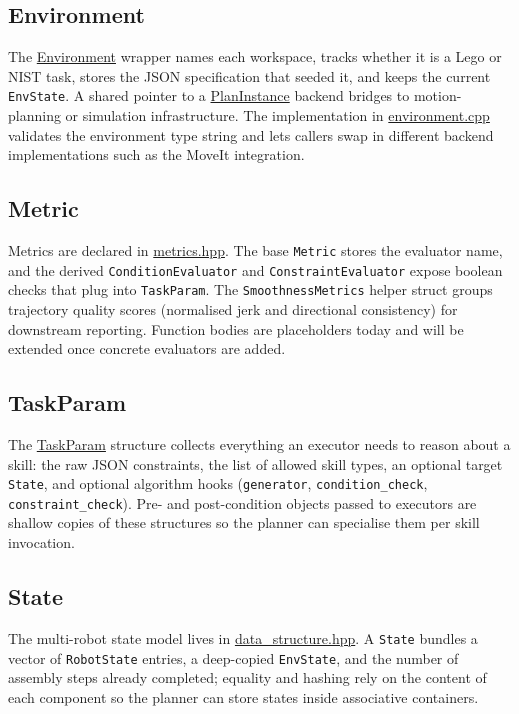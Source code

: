 \documentclass{article}
\begin{document}
\subsection{Environment}
The \href{https://github.com/intelligent-control-lab/AIDF/blob/main/skillgraph/api/environment.hpp#L16}{Environment} wrapper names each workspace, tracks whether it is a Lego or NIST task, stores the JSON specification that seeded it, and keeps the current \texttt{EnvState}. A shared pointer to a \href{https://github.com/intelligent-control-lab/AIDF/blob/main/skillgraph/api/backend.hpp#L8}{PlanInstance} backend bridges to motion-planning or simulation infrastructure. The implementation in \href{https://github.com/intelligent-control-lab/AIDF/blob/main/skillgraph/src/environment.cpp#L11}{environment.cpp} validates the environment type string and lets callers swap in different backend implementations such as the MoveIt integration.

\subsection{Metric}
Metrics are declared in \href{https://github.com/intelligent-control-lab/AIDF/blob/main/skillgraph/api/metrics.hpp#L10}{metrics.hpp}. The base \texttt{Metric} stores the evaluator name, and the derived \texttt{ConditionEvaluator} and \texttt{ConstraintEvaluator} expose boolean checks that plug into \texttt{TaskParam}. The \texttt{SmoothnessMetrics} helper struct groups trajectory quality scores (normalised jerk and directional consistency) for downstream reporting. Function bodies are placeholders today and will be extended once concrete evaluators are added.

\subsection{TaskParam}
The \href{https://github.com/intelligent-control-lab/AIDF/blob/main/skillgraph/api/tasks.hpp#L20}{TaskParam} structure collects everything an executor needs to reason about a skill: the raw JSON constraints, the list of allowed skill types, an optional target \texttt{State}, and optional algorithm hooks (\texttt{generator}, \texttt{condition_check}, \texttt{constraint_check}). Pre- and post-condition objects passed to executors are shallow copies of these structures so the planner can specialise them per skill invocation.

\subsection{State}
The multi-robot state model lives in \href{https://github.com/intelligent-control-lab/AIDF/blob/main/skillgraph/api/data_structure.hpp#L102}{data_structure.hpp}. A \texttt{State} bundles a vector of \texttt{RobotState} entries, a deep-copied \texttt{EnvState}, and the number of assembly steps already completed; equality and hashing rely on the content of each component so the planner can store states inside associative containers.
\end{document}
